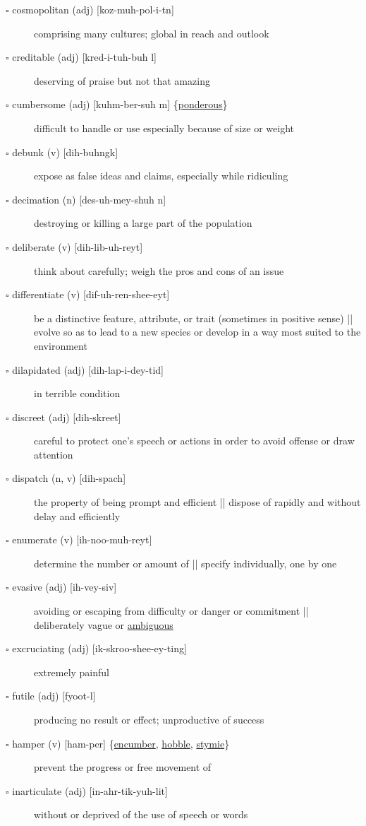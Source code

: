 \documentclass[11pt]{article}
\begin{document}
\begin{description}
\item[{$\square$ cosmopolitan (adj) [koz-muh-pol-i-tn]}] comprising many cultures; global in reach and outlook
\item[{$\square$ creditable (adj) [kred-i-tuh-buh l]}] deserving of praise but not that amazing
\item[{$\square$ \label{orgbef640f}cumbersome (adj) [kuhm-ber-suh m] \{\hyperref[orgbbf759e]{ponderous}\}}] difficult to handle or use especially because of size or weight
\item[{$\square$ debunk (v) [dih-buhngk]}] expose as false ideas and claims, especially while ridiculing
\item[{$\square$ decimation (n) [des-uh-mey-shuh n]}] destroying or killing a large part of the population
\item[{$\square$ deliberate (v) [dih-lib-uh-reyt]}] think about carefully; weigh the pros and cons of an issue
\item[{$\square$ differentiate (v) [dif-uh-ren-shee-eyt]}] be a distinctive feature, attribute, or trait (sometimes in positive sense) || evolve so as to lead to a new species or develop in a way most suited to the environment
\item[{$\square$ dilapidated (adj) [dih-lap-i-dey-tid]}] in terrible condition
\item[{$\square$ discreet (adj) [dih-skreet]}] careful to protect one's speech or actions in order to avoid offense or draw attention
\item[{$\square$ dispatch (n, v) [dih-spach]}] the property of being prompt and efficient || dispose of rapidly and without delay and efficiently
\item[{$\square$ enumerate (v) [ih-noo-muh-reyt]}] determine the number or amount of || specify individually, one by one
\item[{$\square$ evasive (adj) [ih-vey-siv]}] avoiding or escaping from difficulty or danger or commitment || deliberately vague or \hyperref[orgc4611e5]{ambiguous}
\item[{$\square$ excruciating (adj) [ik-skroo-shee-ey-ting]}] extremely painful
\item[{$\square$ futile (adj) [fyoot-l]}] producing no result or effect; unproductive of success
\item[{$\square$ \label{org9f73bfc}hamper (v) [ham-per] \{\hyperref[org33c332c]{encumber}, \hyperref[org9c8bffd]{hobble}, \hyperref[orgeb01fe1]{stymie}\}}] prevent the progress or free movement of
\item[{$\square$ inarticulate (adj) [in-ahr-tik-yuh-lit]}] without or deprived of the use of speech or words

\end{description}
\end{document}
